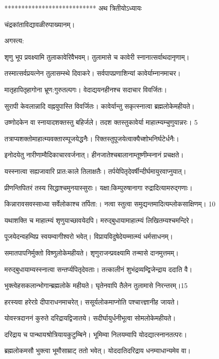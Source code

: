 ***************************
अथ त्रितीयोऽध्यायः

चंद्रकांताविद्यावळीरुपाख्यानम्।

अगस्त्य:

शृणु भूप प्रवक्ष्यामि तुलाकावेरिवैभवम्।
 तुलामासे च कावेरी स्नानात्सर्वाथदानृणाम्।

 तस्मात्सर्वप्रयत्नेन तुलासम्स्थे दिवाकरे।
 सर्वपापप्रणाशिन्यां कावेर्याम्नानमाचर।

 मातृहापितृहागोना भ्रूण:गुरुतल्पगः।
 वेदाद्ययनहीनश्च सदाचार विवर्जितः।

 सुरापी केवलान्नादि वह्नयुपास्ति विवर्जितः।
 कावेर्यान्तु सकृत्स्नात्वा ब्रह्मलोकेमहीयते।

 उष्णोदकेन वा स्नायादशक्तस्तु बहिर्जले।
 तदश क्तस्तुकावेर्या माहात्म्यम्चुणुयान्नरः। 5

  तत्राप्यशक्तोमाहात्म्यवक्तारम्पूजयेद्धनैः।
 रिक्तस्तुपूजयेत्वाक्यैच्शोभनिर्घटेर्धनैः।
 
 इनोदयेतु नारीणाम्वैदिकाचारवर्जनात्।
 हीनजातेश्चबालानाम्तूष्णीम्स्नानं प्रचक्षते।
 
यस्स्नात्वा सह्यजावारि प्रात:काले तिलाक्षतैः।
 तर्पयेपितृदेवर्षीन्दीर्घमायुरवाप्नुयात्।

 प्रीणन्तिपितरं तस्य सिद्धाश्चमुनयास्सुराः।
 यक्षा:किम्पुरुषानागा रुद्रादित्यामरुद्गणाः।

 किन्नारावसवस्साध्या सर्वेलोकाश्च तर्पिता:।
 नत्वा स्तुत्वा समुद्यन्तमादित्यम्लोकसाक्षिणम्। 10

  यथाशक्ति च माहात्म्यं शृणुयाच्छावयेदपि।
 मरुद्बुधायामाहात्म्यं लिखितम्यश्चमन्दिरे।
 
 पूजयेदन्वहम्विप्र स्वयम्वागीश्वरो भवेत्।
 विप्रायविदुषेदेयम्मात्म्यं धर्मसाधनम्।
 
 समातपापनिर्मुक्तो विष्णुलोकेमहीयते।
 शृणुराजन्प्रवक्ष्यामि तन्मासे दानमुत्तमम्।
 
 मरुद्बुधायाम्यस्स्नात्वा सन्तर्प्यपितृदेवताः।
 तत्कालीनं शुभंद्रव्यम्द्विजेन्द्राय ददाति वै।
 
 भुक्त्वेहसकलान्भोगान्ब्रह्मलोके महीयते।
 घृतेनवापि तैलेन तुलामासे निरन्तरम्।15 

 हरस्यवा हरेरग्रे दीपाराधनमाचरेत्।
 ससूर्यलोकमाप्नोति पश्चात्त्ज्ञानीह जायते।
 
 योवस्त्रदाननं कुरुते दरिद्रायद्विजातये।
 सदीर्घायुर्धनीभूत्वा सोमलोकेमहीयते।
 
 दरिद्राय च पान्थायश्रोत्रियायकुटुम्बिने।
 भूमिम्वा निलयम्वापि योदद्यात्स्नानतत्परः।

ब्रह्मलोकमसौ भुक्त्वा भूमौसाम्राट् ततो भवेत्।
 योददातिदरिद्राय धनम्वाधान्यमेव वा।

